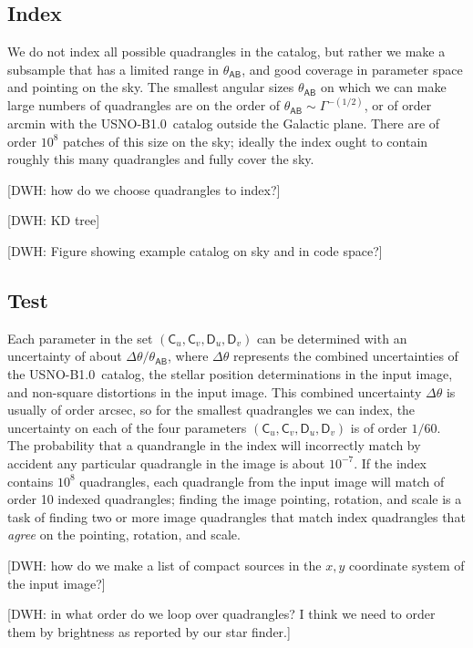 \documentclass[12pt,preprint]{aastex}
\newcommand{\usnob}{USNO-B1.0}
\newcommand{\starlabel}[1]{\mathsf{#1}}
\newcommand{\AAA}{\starlabel{A}}
\newcommand{\BBB}{\starlabel{B}}
\newcommand{\CCC}{\starlabel{C}}
\newcommand{\DDD}{\starlabel{D}}
\newcommand{\thetaAB}{\theta_{\AAA\BBB}}
\begin{document}
\subsection{Index}

We do not index all possible quadrangles in the catalog, but rather we
make a subsample that has a limited range in $\thetaAB$, and good
coverage in parameter space and pointing on the sky.  The smallest
angular sizes $\thetaAB$ on which we can make large numbers of
quadrangles are on the order of $\thetaAB\sim\Gamma^{-(1/2)}$, or of
order arcmin with the \usnob\ catalog outside the Galactic plane.
There are of order $10^8$ patches of this size on the sky; ideally the
index ought to contain roughly this many quadrangles and fully cover
the sky.

[DWH: how do we choose quadrangles to index?]

[DWH: KD tree]

[DWH: Figure showing example catalog on sky and in code space?]

\subsection{Test}

Each parameter in the set $(\CCC_u,\CCC_v,\DDD_u,\DDD_v)$ can be
determined with an uncertainty of about $\Delta\theta/\thetaAB$, where
$\Delta\theta$ represents the combined uncertainties of the \usnob\
catalog, the stellar position determinations in the input image, and
non-square distortions in the input image.  This combined uncertainty
$\Delta\theta$ is usually of order arcsec, so for the smallest
quadrangles we can index, the uncertainty on each of the four
parameters $(\CCC_u,\CCC_v,\DDD_u,\DDD_v)$ is of order $1/60$.  The
probability that a quandrangle in the index will incorrectly match by
accident any particular quadrangle in the image is about $10^{-7}$.
If the index contains $10^8$ quadrangles, each quadrangle from the
input image will match of order 10 indexed quadrangles; finding the
image pointing, rotation, and scale is a task of finding two or more
image quadrangles that match index quadrangles that \emph{agree} on
the pointing, rotation, and scale.

[DWH: how do we make a list of compact sources in the $x,y$ coordinate
  system of the input image?]

[DWH: in what order do we loop over quadrangles?  I think we need to
  order them by brightness as reported by our star finder.]
\end{document}
